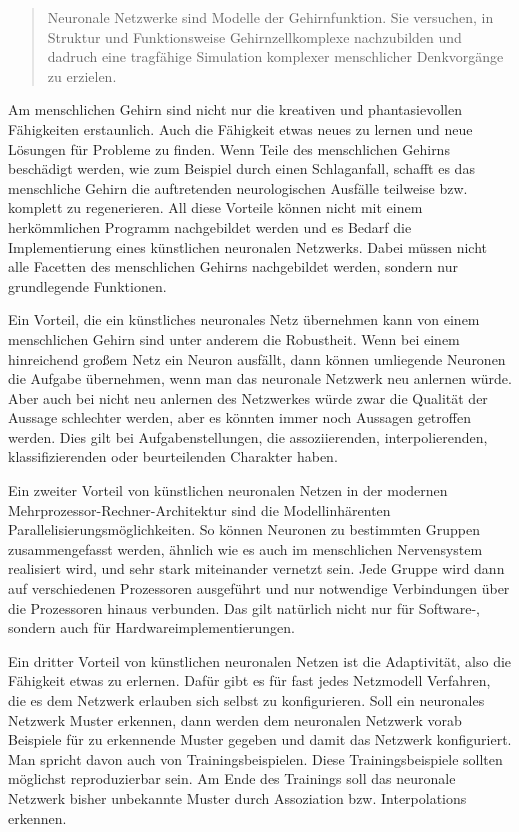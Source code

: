 \begin{quote}
    Neuronale Netzwerke sind Modelle der Gehirnfunktion. Sie versuchen, in Struktur und Funktionsweise Gehirnzellkomplexe nachzubilden und dadruch eine tragfähige Simulation komplexer menschlicher Denkvorgänge zu erzielen. \cite[S. 12]{Kratzer1991} 
\end{quote}

Am menschlichen Gehirn sind nicht nur die kreativen und phantasievollen Fähigkeiten erstaunlich. Auch die Fähigkeit etwas neues zu lernen und neue Lösungen für Probleme zu finden. Wenn Teile des menschlichen Gehirns beschädigt werden, wie zum Beispiel durch einen Schlaganfall, schafft es das menschliche Gehirn die auftretenden neurologischen Ausfälle teilweise bzw. komplett zu regenerieren. All diese Vorteile können nicht mit einem herkömmlichen Programm nachgebildet werden und es Bedarf die Implementierung eines künstlichen neuronalen Netzwerks. Dabei müssen nicht alle Facetten des menschlichen Gehirns nachgebildet werden, sondern nur grundlegende Funktionen.

Ein Vorteil, die ein künstliches neuronales Netz übernehmen kann von einem menschlichen Gehirn sind unter anderem die Robustheit. Wenn bei einem hinreichend großem Netz ein Neuron ausfällt, dann können umliegende Neuronen die Aufgabe übernehmen, wenn man das neuronale Netzwerk neu anlernen würde. Aber auch bei nicht neu anlernen des Netzwerkes würde zwar die Qualität der Aussage schlechter werden, aber es könnten immer noch Aussagen getroffen werden. Dies gilt bei Aufgabenstellungen, die  assoziierenden, interpolierenden, klassifizierenden oder beurteilenden Charakter haben.

Ein zweiter Vorteil von künstlichen neuronalen Netzen in der modernen Mehrprozessor-Rechner-Architektur sind die Modellinhärenten Parallelisierungsmöglichkeiten. So können Neuronen zu bestimmten Gruppen zusammengefasst werden, ähnlich wie es auch im menschlichen Nervensystem realisiert wird, und sehr stark miteinander vernetzt sein. Jede Gruppe wird dann auf verschiedenen Prozessoren ausgeführt und nur notwendige Verbindungen über die Prozessoren hinaus verbunden. Das gilt natürlich nicht nur für Software-, sondern auch für Hardwareimplementierungen.

Ein dritter Vorteil von künstlichen neuronalen Netzen ist die Adaptivität, also die Fähigkeit etwas zu erlernen. Dafür gibt es für fast jedes Netzmodell Verfahren, die es dem Netzwerk erlauben sich selbst zu konfigurieren. Soll ein neuronales Netzwerk Muster erkennen, dann werden dem neuronalen Netzwerk vorab Beispiele für zu erkennende Muster gegeben und damit das Netzwerk konfiguriert. Man spricht davon auch von Trainingsbeispielen. Diese Trainingsbeispiele sollten möglichst reproduzierbar sein. Am Ende des Trainings soll das neuronale Netzwerk bisher unbekannte Muster durch Assoziation bzw. Interpolations erkennen.

